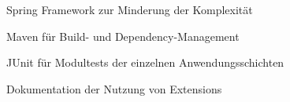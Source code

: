 \begin{frame}
\begin{block}{}
	Spring Framework zur Minderung der Komplexität
\end{block}
\begin{block}{}
	Maven für Build- und Dependency-Management
\end{block}
\begin{block}{}
	JUnit für Modultests der einzelnen Anwendungsschichten
\end{block}
\begin{block}{}
	Dokumentation der Nutzung von Extensions
\end{block}
\end{frame}